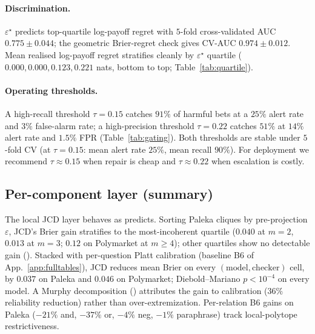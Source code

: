 \documentclass{article}
\theoremstyle{plain}
\theoremstyle{definition}
\theoremstyle{remark}
\newcommand{\eps}{\varepsilon}
\begin{document}
\paragraph{Discrimination.}
$\eps^\star$ predicts top-quartile log-payoff regret with $5$-fold
cross-validated AUC $0.775\!\pm\!0.044$; the geometric Brier-regret
check gives CV-AUC $0.974\!\pm\!0.012$. Mean realised log-payoff
regret stratifies cleanly by $\eps^\star$ quartile
($0.000, 0.000, 0.123, 0.221$ nats, bottom to top;
Table~\ref{tab:quartile}).

\paragraph{Operating thresholds.}
A high-recall threshold $\tau\!=\!0.15$ catches $91\%$ of harmful
bets at a $25\%$ alert rate and $3\%$ false-alarm rate; a
high-precision threshold $\tau\!=\!0.22$ catches $51\%$ at
$14\%$ alert rate and $1.5\%$ FPR (Table~\ref{tab:gating}). Both
thresholds are stable under $5$-fold CV (at $\tau\!=\!0.15$:
mean alert rate $25\%$, mean recall $90\%$). For deployment we
recommend $\tau\!\approx\!0.15$ when repair is cheap and
$\tau\!\approx\!0.22$ when escalation is costly.

\begin{table}[h]
\centering
\resizebox{\linewidth}{!}{}
\caption{\textbf{Operating points for the $\eps^\star$ gate},
computed in-sample then verified by $5$-fold CV (mean shown
in parentheses where it differs from the in-sample number).}
\label{tab:gating}
\end{table}

\subsection{Per-component layer (summary)}
\label{subsec:percomp}

The local JCD layer behaves as  predicts. Sorting
Paleka cliques by pre-projection $\eps$, JCD's Brier gain stratifies
to the most-incoherent quartile ($0.040$ at $m{=}2$, $0.013$ at $m{=}3$;
$0.12$ on Polymarket at $m{\ge}4$); other quartiles show no detectable
gain (). Stacked with per-question
Platt calibration \citep{platt1999probabilistic} (baseline B6 of
App.~\ref{app:fulltables}), JCD reduces mean Brier on every
$(\text{model},\text{checker})$ cell, by $0.037$ on Paleka and $0.046$
on Polymarket; Diebold--Mariano $p<10^{-4}$ on every model. A Murphy
decomposition () attributes the gain to
calibration ($36\%$ reliability reduction) rather than
over-extremization. Per-relation B6 gains on Paleka ($-21\%$ and,
$-37\%$ or, $-4\%$ neg, $-1\%$ paraphrase) track local-polytope
restrictiveness.
\end{document}
